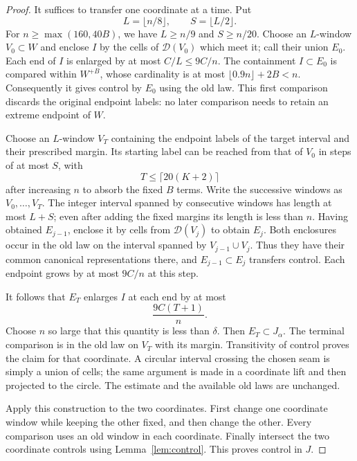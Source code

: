 \begin{proof}
It suffices to transfer one coordinate at a time.  Put
\[
 L=\lfloor n/8\rfloor,\qquad S=\lfloor L/2\rfloor.
\]
For $n\ge\max(160,40B)$, we have $L\ge n/9$ and $S\ge n/20$.
Choose an $L$-window $V_0\subset W$ and enclose $I$ by the cells of
$\mathcal D(V_0)$ which meet it; call their union $E_0$.
Each end of $I$ is enlarged by at most $C/L\le9C/n$.
The containment $I\subset E_0$ is compared within $W^{+B}$, whose
cardinality is at most $\lfloor0.9n\rfloor+2B<n$.  Consequently it gives
control by $E_0$ using the old law.  This first comparison discards the original
endpoint labels: no later comparison needs to retain an extreme
endpoint of $W$.

Choose an $L$-window $V_T$ containing the endpoint labels of the target
interval and their prescribed margin.  Its starting label can be
reached from that of $V_0$ in steps of at most $S$, with
\[
 T\le \lceil20(K+2)\rceil
\]
after increasing $n$ to absorb the fixed $B$ terms.  Write the
successive windows as $V_0,\ldots,V_T$.  The integer interval spanned
by consecutive windows has length at most $L+S$; even after adding
the fixed margins its length is less than $n$.  Having obtained
$E_{j-1}$, enclose it by cells from $\mathcal D(V_j)$ to obtain $E_j$.
Both enclosures occur in the old law on the interval spanned by
$V_{j-1}\cup V_j$.  Thus they have their common canonical
representations there, and $E_{j-1}\subset E_j$ transfers control.
Each endpoint grows by at most $9C/n$ at this step.

It follows that $E_T$ enlarges $I$ at each end by at most
\begin{equation}\label{eq:bridge-error}
 \frac{9C(T+1)}{n}.
\end{equation}
Choose $n$ so large that this quantity is less than $\delta$.
Then $E_T\subset J_\alpha$.  The terminal comparison is in the old
law on $V_T$ with its margin.  Transitivity of control proves the
claim for that coordinate.  A circular interval crossing the chosen
seam is simply a union of cells; the same argument is made in a
coordinate lift and then projected to the circle.  The estimate and
the available old laws are unchanged.

Apply this construction to the two coordinates.  First change one
coordinate window while keeping the other fixed, and then change the
other.  Every comparison uses an old window in each coordinate.
Finally intersect the two coordinate controls using
Lemma~\ref{lem:control}.  This proves control in $J$.
\end{proof}

